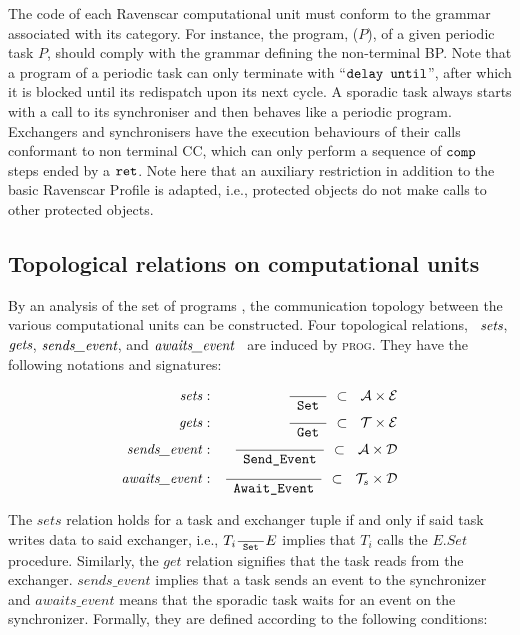 The code of each Ravenscar computational unit must conform to the
grammar associated with its category. For instance, the program,
($P$), of a given periodic task $P$, should comply
with the grammar defining the non-terminal BP. Note that a program of
a periodic task can only terminate with ``${\text{\ttfamily delay
    until}}$'', after which it is blocked until its redispatch upon
its next cycle. A sporadic task always starts with a call to its
synchroniser and then behaves like a periodic program. Exchangers and
synchronisers have the execution behaviours of their calls conformant
to non terminal CC, which can only perform a sequence of
${\text{\ttfamily comp}}$ steps ended by a ${\text{\ttfamily
    ret}}$. Note here that an auxiliary restriction in addition to the
basic Ravenscar Profile is adapted, i.e., protected objects do not
make calls to other protected objects.

\subsection{Topological relations on computational units}
By an analysis of the set of programs , the
communication topology between the various computational units can be
constructed. Four topological relations, \ $\emph{sets}$,
$\emph{gets}$, $\emph{sends\_event}$, and $\emph{awaits\_event}$ \ are
induced by {\scshape prog}. They have the following notations and
signatures:

\begin{eqnarray}
  \text{\emph{sets}} & : & \rset \ \subset\  \ {\cal A} \times {\cal
  E} \\
  \text{\emph{gets}} & : & \rget \ \subset \ \ {\cal T} \times {\cal
  E}  \\
  \text{\emph{sends\_event}} & : &  \rsvt \  \subset \ \ {\cal A}
  \times {\cal D} \\
  \text{\emph{awaits\_event}} & : &  \rgvt \ \subset \ \ {\cal T}_s
  \times {\cal D}
\end{eqnarray}

The $sets$ relation holds for a task and exchanger tuple if and only
if said task writes data to said exchanger, i.e., $T_i \frac{}{\text{\ttfamily\ Set\ }} E$
implies that $T_i$ calls the $E.Set$ procedure. Similarly, the $get$
relation signifies that the task reads from the
exchanger. $sends\_event$ implies that a task sends an event to the
synchronizer and $awaits\_event$ means that the sporadic task waits
for an event on the synchronizer. Formally, they are defined according
to the following conditions:

